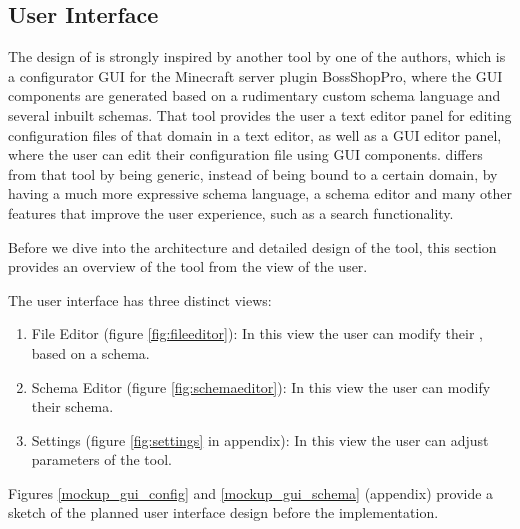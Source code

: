 
\subsection{User Interface}\label{subsec:overview}
The design of \toolname{} is strongly inspired by another tool by one of the authors, which is a configurator GUI for the Minecraft server plugin BossShopPro\cite{bossshoppro}, where the GUI components are generated based on a rudimentary custom schema language and several inbuilt schemas.
That tool provides the user a text editor panel for editing configuration files of that domain in a text editor, as well as a GUI editor panel, where the user can edit their configuration file using GUI components.\cite{githubBspEditor}
\toolname{} differs from that tool by being generic, instead of being bound to a certain domain, by having a much more expressive schema language, a schema editor and many other features that improve the user experience, such as a search functionality.

Before we dive into the architecture and detailed design of the tool, this section provides an overview of the tool from the view of the user.

The user interface has three distinct views:
\begin{enumerate}
	\item File Editor (figure \ref{fig:fileeditor}): In this view the user can modify their \cfgfile{}, based on a schema.
	\item Schema Editor (figure \ref{fig:schemaeditor}): In this view the user can modify their schema.
	\item Settings (figure \ref{fig:settings} in appendix): In this view the user can adjust parameters of the tool.
\end{enumerate}


Figures \ref{mockup_gui_config} and \ref{mockup_gui_schema} (appendix) provide a sketch of the planned user interface design before the implementation.



